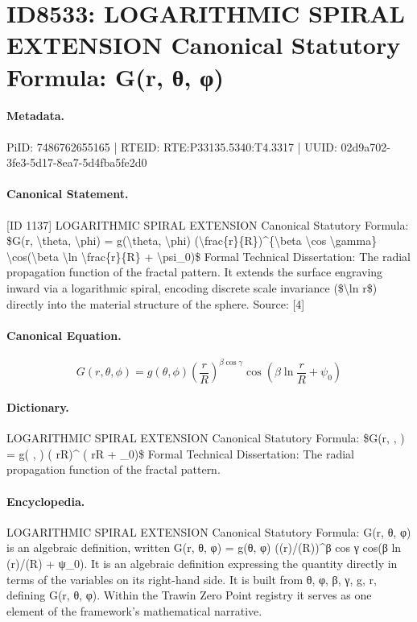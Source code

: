 \section*{ID8533: LOGARITHMIC SPIRAL EXTENSION Canonical Statutory Formula: G(r, θ, φ)}
\paragraph{Metadata.}
PiID: 7486762655165 | RTEID: RTE:P33135.5340:T4.3317 | UUID: 02d9a702-3fe3-5d17-8ea7-5d4fba5fe2d0

\paragraph{Canonical Statement.}
[ID 1137] LOGARITHMIC SPIRAL EXTENSION Canonical Statutory Formula: \$G(r, \textbackslash{}theta, \textbackslash{}phi) = g(\textbackslash{}theta, \textbackslash{}phi) (\textbackslash{}frac\{r\}\{R\})\textasciicircum{}\{\textbackslash{}beta \textbackslash{}cos \textbackslash{}gamma\} \textbackslash{}cos(\textbackslash{}beta \textbackslash{}ln \textbackslash{}frac\{r\}\{R\} + \textbackslash{}psi\_0)\$ Formal Technical Dissertation: The radial propagation function of the fractal pattern. It extends the surface engraving inward via a logarithmic spiral, encoding discrete scale invariance (\$\textbackslash{}ln r\$) directly into the material structure of the sphere. Source: [4]

\paragraph{Canonical Equation.}
\[
G(r, \theta, \phi) = g(\theta, \phi) (\frac{r}{R})^{\beta \cos \gamma} \cos(\beta \ln \frac{r}{R} + \psi_0)
\]

\paragraph{Dictionary.}
LOGARITHMIC SPIRAL EXTENSION Canonical Statutory Formula: \$G(r, , ) = g( , ) ( rR)\textasciicircum{} ( rR + \_0)\$ Formal Technical Dissertation: The radial propagation function of the fractal pattern.

\paragraph{Encyclopedia.}
LOGARITHMIC SPIRAL EXTENSION Canonical Statutory Formula: G(r, θ, φ) is an algebraic definition, written G(r, θ, φ) = g(θ, φ) ((r)/(R))\textasciicircum{}β cos γ cos(β ln (r)/(R) + ψ\_0). It is an algebraic definition expressing the quantity directly in terms of the variables on its right-hand side. It is built from θ, φ, β, γ, g, r, defining G(r, θ, φ). Within the Trawin Zero Point registry it serves as one element of the framework's mathematical narrative.
